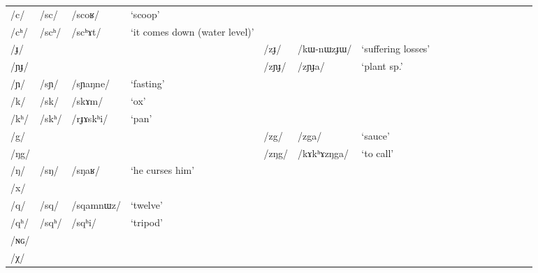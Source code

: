 \documentclass[12pt]{article}
\newcommand{\ipa}[1]{\mbox{\phon/#1/}}
\newcommand{\deux}[1]{\ipa{#1}\addtocounter{2clusters}{1}}
\begin{document}
\begin{landscape}
\begin{longtable}{lllllllllllllllll}
\ipa{c}  & 	 \deux{sc}  & 	 \ipa{scoʁ}  & 	 `scoop'  & 	  & 	  & 	  & 	\\
\ipa{cʰ}  & 	 \deux{scʰ}  & 	 \ipa{scʰɤt}  & 	 `it comes down (water level)'  & 	  & 	  & 	  & 	\\
\ipa{ɟ}  & 	  & 	  & 	  & 	 \deux{zɟ}  & 	 \ipa{kɯ-nɯzɟɯ}  & 	 `suffering losses'  & 	\\
\ipa{ɲɟ}  & 	  & 	  & 	  & 	 \deux{zɲɟ}  & 	 \ipa{zɲɟa}  & 	 `plant sp.'  & 	\\
\ipa{ɲ}  & 	 \deux{sɲ}  & 	 \ipa{sɲaŋne}  & 	 `fasting'  & 	  & 	  & 	  & 	\\
\ipa{k}  & 	 \deux{sk}  & 	 \ipa{skɤm}  & 	 `ox'  & 	  & 	  & 	  & 	\\
\ipa{kʰ}  & 	 \deux{skʰ}  & 	 \ipa{rɟɤskʰi}  & 	 `pan'  & 	  & 	  & 	  & 	\\
\ipa{g}  & 	  & 	  & 	  & 	 \deux{zg}  & 	 \ipa{zga}  & 	 `sauce'  & 	\\
\ipa{ŋg}  & 	  & 	  & 	  & 	 \deux{zŋg}  & 	 \ipa{kɤkʰɤzŋga}  & 	 `to call'  & 	\\
\ipa{ŋ}  & 	 \deux{sŋ}  & 	 \ipa{sŋaʁ}  & 	 `he curses him'  & 	  & 	  & 	  & 	\\
\ipa{x}  & 	  & 	  & 	  & 	  & 	  & 	  & 	\\
\ipa{q}  & 	 \deux{sq}  & 	 \ipa{sqamnɯz}  & 	 `twelve'  & 	  & 	  & 	  & 	\\
\ipa{qʰ}  & 	 \deux{sqʰ}  & 	 \ipa{sqʰi}  & 	 `tripod'  & 	  & 	  & 	  & 	\\
\ipa{ɴɢ}  & 	  & 	  & 	  & 	  & 	  & 	  & 	\\
\ipa{χ}  & 	  & 	  & 	  & 	  & 	  & 	  & 	\\
\bottomrule
\end{longtable}
\end{landscape}
\end{document}
